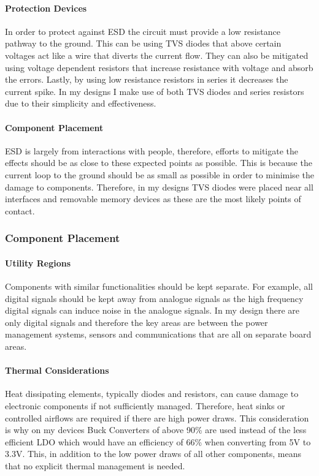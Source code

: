 \paragraph{Protection Devices}
In order to protect against \gls{ESD} the circuit must provide a low resistance pathway to the ground. This can be using \gls{TVS} diodes that above certain voltages act like a wire that diverts the current flow. They can also be mitigated using voltage dependent resistors that increase resistance with voltage and absorb the errors. Lastly, by using low resistance resistors in series it decreases the current spike. In my designs I make use of both \gls{TVS} diodes and series resistors due to their simplicity and effectiveness.
\paragraph{Component Placement}
\gls{ESD} is largely from interactions with people, therefore, efforts to mitigate the effects should be as close to these expected points as possible. This is because the current loop to the ground should be as small as possible in order to minimise the damage to components. Therefore, in my designs \gls{TVS} diodes were placed near all interfaces and removable memory devices as these are the most likely points of contact.

\subsubsection{Component Placement}
\paragraph{Utility Regions}
Components with similar functionalities should be kept separate. For example, all digital signals should be kept away from analogue signals as the high frequency digital signals can induce noise in the analogue signals. In my design there are only digital signals and therefore the key areas are between the power management systems, sensors and communications that are all on separate board areas.
\paragraph{Thermal Considerations}
Heat dissipating elements, typically diodes and resistors, can cause damage to electronic components if not sufficiently managed. Therefore, heat sinks or controlled airflows are required if there are high power draws. This consideration is why on my devices Buck Converters of above 90\% \cite{REF} are used instead of the less efficient \gls{LDO} which would have an efficiency of 66\% when converting from 5V to 3.3V. This, in addition to the low power draws of all other components, means that no explicit thermal management is needed.

